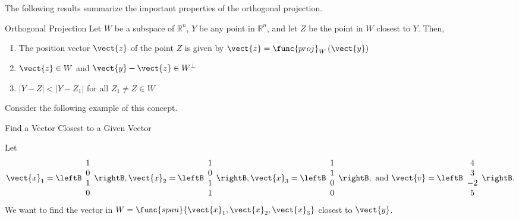 The following results summarize the important properties of the orthogonal projection. 

\begin{theorem}{Orthogonal Projection}\label{thm:orthproj}
Let $W$ be a subspace of $\mathbb{R}^n$, $Y$ be any point in $\mathbb{R}^n$, and let $Z$ be the point in $W$ closest to $Y$. Then, 
\begin{enumerate}
\item 
The position vector $\vect{z}$ of the point $Z$ is given by $\vect{z} = \func{proj}_{W}\left( \vect{y}\right)$
\item
$\vect{z} \in W$ and $\vect{y} - \vect{z} \in W^{\perp}$
\item
$| Y - Z | < | Y - Z_1 |$ for all $Z_1 \neq Z \in W$
\end{enumerate}
\end{theorem}

Consider the following example of this concept.

\begin{example}{Find a Vector Closest to a Given Vector}\label{exa:vectorclosestvector}

Let
\[ \vect{x}_1=\leftB\begin{array}{c} 1\\ 0\\ 1\\ 0 \end{array}\rightB,
\vect{x}_2=\leftB\begin{array}{c} 1\\ 0\\ 1\\ 1 \end{array}\rightB,
\vect{x}_3=\leftB\begin{array}{c} 1\\ 1\\ 0\\ 0 \end{array}\rightB,
\mbox{ and }
\vect{v}=\leftB\begin{array}{c} 4\\ 3\\ -2\\ 5 \end{array}\rightB. \]
We want to find the vector in
$W =\func{span}\{\vect{x}_1, \vect{x}_2,\vect{x}_3\}$
closest to $\vect{y}$.
\end{example}

